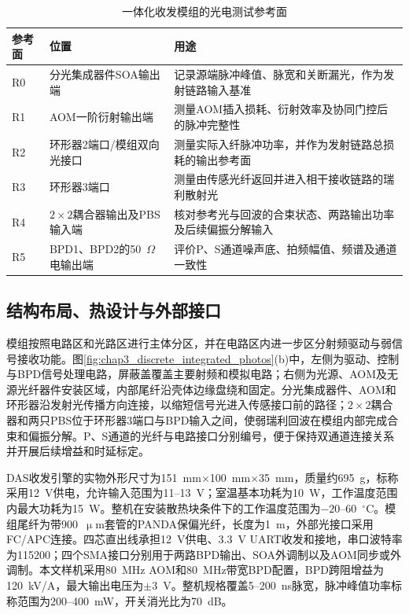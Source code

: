 \begin{table}[htbp]
  \centering
  \caption{一体化收发模组的光电测试参考面}
  \label{tab:chap3_module_reference_planes}
  \renewcommand{\arraystretch}{1.2}
  \small
  \begin{tabular}{p{}p{}p{}}
    \toprule
    参考面 & 位置 & 用途 \\
    \midrule
    R0 & 分光集成器件SOA输出端 & 记录源端脉冲峰值、脉宽和关断漏光，作为发射链路输入基准 \\
    R1 & AOM一阶衍射输出端 & 测量AOM插入损耗、衍射效率及协同门控后的脉冲完整性 \\
    R2 & 环形器2端口/模组双向光接口 & 测量实际入纤脉冲功率，并作为发射链路总损耗的输出参考面 \\
    R3 & 环形器3端口 & 测量由传感光纤返回并进入相干接收链路的瑞利散射光 \\
    R4 & $2\times2$耦合器输出及PBS输入端 & 核对参考光与回波的合束状态、两路输出功率及后续偏振分解输入 \\
    R5 & BPD1、BPD2的50~$\Omega$电输出端 & 评价P、S通道噪声底、拍频幅值、频谱及通道一致性 \\
    \bottomrule
  \end{tabular}
\end{table}

\subsection{结构布局、热设计与外部接口}

模组按照电路区和光路区进行主体分区，并在电路区内进一步区分射频驱动与弱信号接收功能。图\ref{fig:chap3_discrete_integrated_photos}(b)中，左侧为驱动、控制与BPD信号处理电路，屏蔽盖覆盖主要射频和模拟电路；右侧为光源、AOM及无源光纤器件安装区域，内部尾纤沿壳体边缘盘绕和固定。分光集成器件、AOM和环形器沿发射光传播方向连接，以缩短信号光进入传感接口前的路径；$2\times2$耦合器和两只PBS位于环形器3端口与BPD输入之间，使弱瑞利回波在模组内部完成合束和偏振分解。P、S通道的光纤与电路接口分别编号，便于保持双通道连接关系并开展后续增益和时延标定。

DAS收发引擎的实物外形尺寸为151~mm$\times$100~mm$\times$35~mm，质量约695~g，标称采用12~V供电，允许输入范围为11--13~V；室温基本功耗为10~W，工作温度范围内最大功耗为15~W。整机在安装散热块条件下的工作温度范围为$-20$--60~$^\circ$C。模组尾纤为带900~$\upmu$m套管的PANDA保偏光纤，长度为1~m，外部光接口采用FC/APC连接。四芯直出线承担12~V供电、3.3~V UART收发和接地，串口波特率为115200；四个SMA接口分别用于两路BPD输出、SOA外调制以及AOM同步或外调制。本文样机采用80~MHz AOM和80~MHz带宽BPD配置，BPD跨阻增益为120~kV/A，最大输出电压为$\pm3$~V。整机规格覆盖5--200~ns脉宽，脉冲峰值功率标称范围为200--400~mW，开关消光比为70~dB。

